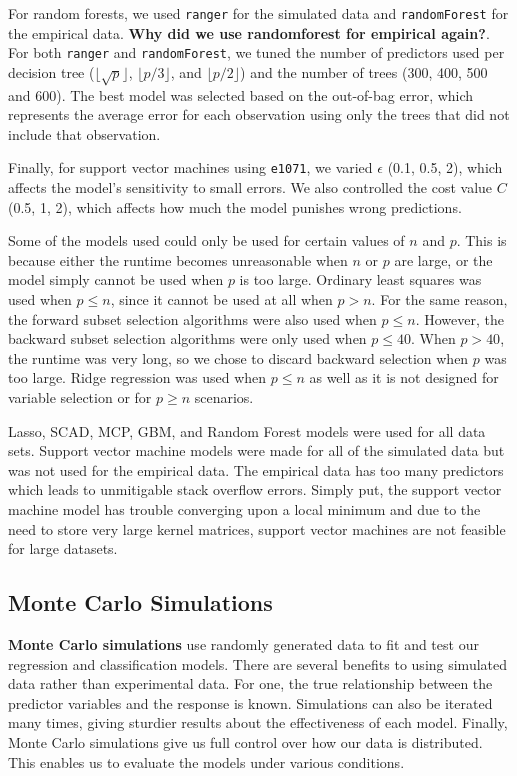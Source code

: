 \documentclass{article}
\begin{document}
For random forests, we used \lstinline!ranger! for the simulated data and \lstinline!randomForest! for the empirical data. \textbf{Why did we use randomforest for empirical again?}. For both \lstinline!ranger! and \lstinline!randomForest!, we tuned the number of predictors used per decision tree ($\lfloor \sqrt{p}\rfloor$, $\lfloor p / 3 \rfloor$, and $\lfloor p / 2 \rfloor$) and the number of trees (300, 400, 500 and 600). The best model was selected based on the out-of-bag error, which represents the average error for each observation using only the trees that did not include that observation.

Finally, for support vector machines using \lstinline!e1071!, we varied $\epsilon$ (0.1, 0.5, 2), which affects the model's sensitivity to small errors. We also controlled the cost value $C$ (0.5, 1, 2), which affects how much the model punishes wrong predictions.

Some of the models used could only be used for certain values of $n$ and $p$. This is because either the runtime becomes unreasonable when $n$ or $p$ are large, or the model simply cannot be used when $p$ is too large. Ordinary least squares was used when $p\leq n$, since it cannot be used at all when $p>n$. For the same reason, the forward subset selection algorithms were also used when $p\leq n$. However, the backward subset selection algorithms were only used when $p\leq 40$. When $p>40$, the runtime was very long, so we chose to discard backward selection when $p$ was too large. Ridge regression was used when $p\leq n$ as well as it is not designed for variable selection or for $p \geq n$ scenarios.

Lasso, SCAD, MCP, GBM, and Random Forest models were used for all data sets. Support vector machine models were made for all of the simulated data but was not used for the empirical data. The empirical data has too many predictors which leads to unmitigable stack overflow errors. Simply put, the support vector machine model has trouble converging upon a local minimum and due to the need to store very large kernel matrices, support vector machines are not feasible for large datasets.
\subsection{Monte Carlo Simulations}

\textbf{Monte Carlo simulations} use randomly generated data to fit and test our regression and classification models. There are several benefits to using simulated data rather than experimental data. For one, the true relationship between the predictor variables and the response is known. Simulations can also be iterated many times, giving sturdier results about the effectiveness of each model. Finally, Monte Carlo simulations give us full control over how our data is distributed. This enables us to evaluate the models under various conditions.
\end{document}
